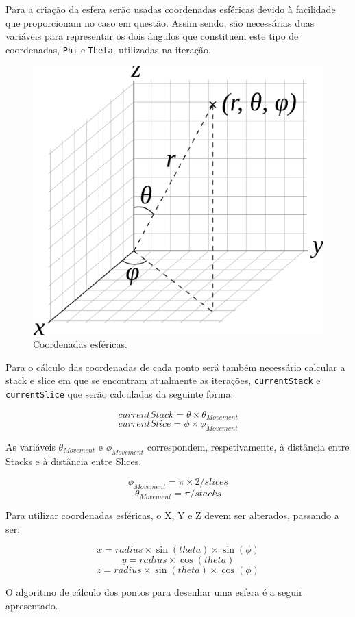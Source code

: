 \documentclass[a4paper]{article}
\begin{document}
Para a criação da esfera serão usadas coordenadas esféricas devido à facilidade que proporcionam no caso em questão. Assim sendo, são necessárias duas variáveis para representar os dois ângulos que constituem este tipo de coordenadas, \texttt{Phi} e \texttt{Theta}, utilizadas na iteração.

\begin{figure}[H]
    \centering
    \includegraphics[width=0.5\linewidth]{coords.png}
    \caption{Coordenadas esféricas.}
\end{figure}

Para o cálculo das coordenadas de cada ponto será também necessário calcular a stack e slice em que se encontram atualmente as iterações, \texttt{currentStack} e \texttt{currentSlice} que serão calculadas da seguinte forma:

\[currentStack = \theta \times \theta_{Movement}\]
\[currentSlice = \phi \times \phi_{Movement}\]


As variáveis $\theta_{Movement}$ e $\phi_{Movement}$ correspondem, respetivamente, à distância entre Stacks e à distância entre Slices.

\[\phi_{Movement} = \pi \times 2 / slices\]
\[\theta_{Movement} = \pi / stacks\]


Para utilizar coordenadas esféricas, o X, Y e Z devem ser alterados, passando a ser:

\[x = radius \times \sin(theta) \times \sin(\phi)\]
\[y = radius \times \cos(theta)\]
\[z = radius \times \sin(theta) \times \cos(\phi)\]

O algoritmo de cálculo dos pontos para desenhar uma esfera é a seguir apresentado.
\end{document}
